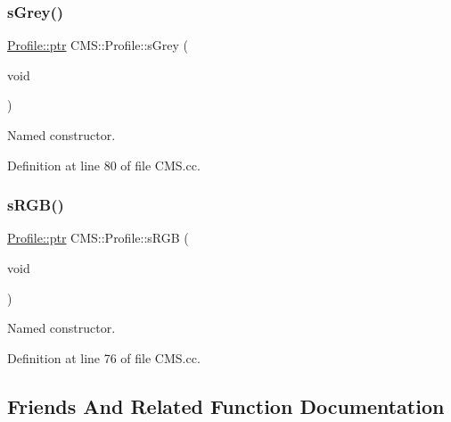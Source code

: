 \subsubsection{\texorpdfstring{s\+Grey()}{sGrey()}}
{\footnotesize\ttfamily \hyperlink{class_c_m_s_1_1_profile_a7d5a80e1317d17dbfdf5ae69820ab08b}{Profile\+::ptr} C\+M\+S\+::\+Profile\+::s\+Grey (\begin{DoxyParamCaption}\item[{void}]{ }\end{DoxyParamCaption})\hspace{0.3cm}{\ttfamily [static]}}



Named constructor. 



Definition at line 80 of file C\+M\+S.\+cc.

\mbox{\label{class_c_m_s_1_1_profile_a7ca6f825e5e356f8553019b36079f93e}} 
\subsubsection{\texorpdfstring{s\+R\+G\+B()}{sRGB()}}
{\footnotesize\ttfamily \hyperlink{class_c_m_s_1_1_profile_a7d5a80e1317d17dbfdf5ae69820ab08b}{Profile\+::ptr} C\+M\+S\+::\+Profile\+::s\+R\+GB (\begin{DoxyParamCaption}\item[{void}]{ }\end{DoxyParamCaption})\hspace{0.3cm}{\ttfamily [static]}}



Named constructor. 



Definition at line 76 of file C\+M\+S.\+cc.



\subsection{Friends And Related Function Documentation}
\mbox{\label{class_c_m_s_1_1_profile_acc1c1bb221523de35625f0057bffe1fd}} 
